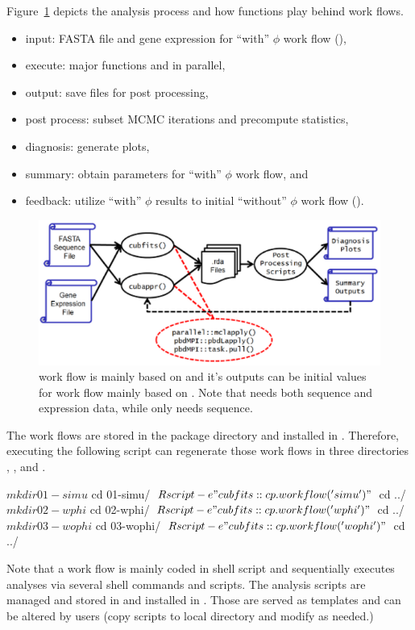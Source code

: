 Figure~\ref{fig:workflows} depicts the analysis process and how 
functions play behind work flows.
\begin{itemize}
\item
input: FASTA file and gene expression for
       ``with'' $\phi$ work flow (),
\item
execute: major functions  and  in parallel,
\item
output: save  files for post processing,
\item
post process: subset MCMC iterations and precompute statistics,
\item
diagnosis: generate plots,
\item
summary: obtain parameters for ``with'' $\phi$ work flow, and
\item
feedback: utilize ``with'' $\phi$ results to initial
          ``without'' $\phi$ work flow ().
\end{itemize}
\begin{figure}[ht]
\centering
\includegraphics[width=5.5in]{cubfits-include/figure/workflows}
\caption{ work flow is mainly based on  and it's
outputs can be initial values for  work flow mainly based on
. Note that  needs both sequence and expression
data, while  only needs sequence.
}
\label{fig:workflows}
\end{figure}

The work flows are stored in the package directory
 and installed in
. Therefore, executing the
following script can regenerate those work flows in three directories
, , and .
\begin{Command}
$ mkdir 01-simu
$ cd 01-simu/
$ Rscript -e "cubfits::cp.workflow('simu')"
$ cd ../
$ mkdir 02-wphi
$ cd 02-wphi/
$ Rscript -e "cubfits::cp.workflow('wphi')"
$ cd ../
$ mkdir 03-wophi
$ cd 03-wophi/
$ Rscript -e "cubfits::cp.workflow('wophi')"
$ cd ../
\end{Command}
Note that a work flow is mainly coded in shell script and sequentially
executes analyses via several shell commands and  scripts. The
analysis  scripts are managed and stored in
 and installed in
. Those are served as
templates and can be altered by users (copy scripts to local directory
and modify as needed.)

